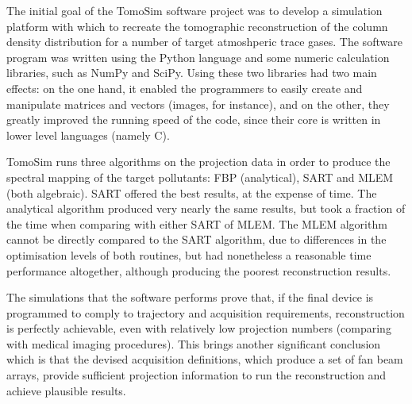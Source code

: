 The initial goal of the TomoSim software project was to develop a
simulation platform with which to recreate the tomographic
reconstruction of the column density distribution for a number of target
atmoshperic trace gases. The software program was written using the
Python language and some numeric calculation libraries, such as NumPy
and SciPy. Using these two libraries had two main effects: on the one
hand, it enabled the programmers to easily create and manipulate
matrices and vectors (images, for instance), and on the other, they
greatly improved the running speed of the code, since their core is
written in lower level languages (namely C).

TomoSim runs three algorithms on the projection data in order to produce
the spectral mapping of the target pollutants: FBP (analytical), SART and
MLEM (both algebraic). SART offered the best results, at the expense of
time. The analytical algorithm produced very nearly the same results,
but took a fraction of the time when comparing with either SART of MLEM.
The MLEM algorithm cannot be directly compared to the SART algorithm,
due to differences in the optimisation levels of both routines, but had
nonetheless a reasonable time performance altogether, although producing
the poorest reconstruction results.

The simulations that the software performs prove that, if the final
device is programmed to comply to trajectory and acquisition
requirements, reconstruction is perfectly achievable, even with
relatively low projection numbers (comparing with medical imaging
procedures). This brings another significant conclusion which is that
the devised acquisition definitions, which produce a set of fan beam
arrays, provide sufficient projection information to run the
reconstruction and achieve plausible results.


